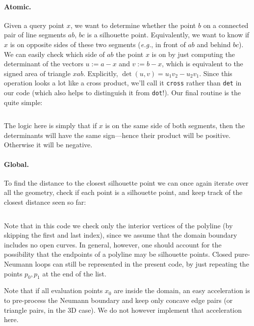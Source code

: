 \documentclass{article}
\newcommand{\code}[1]{\texttt{\small{#1}}}
\newcommand{\eg}{\emph{e.g.}} %
\renewcommand{\vec}[1]{#1}
\begin{document}
\paragraph{Atomic.} Given a query point \(\vec{x}\), we want to determine whether the point \(\vec{b}\) on a connected pair of line segments \(\vec{a}\vec{b}\), \(\vec{b}\vec{c}\) is a silhouette point.  Equivalently, we want to know if \(\vec{x}\) is on opposite sides of these two segments (\eg{}, in front of \(\vec{a}\vec{b}\) and behind \(\vec{b}\vec{c}\)).  We can easily check which side of \(\vec{a}\vec{b}\) the point \(\vec{x}\) is on by just computing the determinant of the vectors \(\vec{u} := \vec{a}-\vec{x}\) and \(\vec{v} := \vec{b}-\vec{x}\), which is equivalent to the signed area of triangle \(xab\).  Explicitly, \(\det(\vec{u},\vec{v}) = \vec{u}_1 \vec{v}_2 - \vec{u}_2 \vec{v}_1\).  Since this operation looks a lot like a cross product, we'll call it \code{cross} rather than \code{det} in our code (which also helps to distinguish it from \code{dot}!).  Our final routine is the quite simple:

\inputminted[fontsize=\small,linenos,firstline=43,lastline=46,bgcolor=bg]{cpp}{../code/WoStLaplace2D.cpp}

The logic here is simply that if \(\vec{x}\) is on the same side of both segments, then the determinants will have the same sign---hence their product will be positive.  Otherwise it will be negative.

\paragraph{Global.} To find the distance to the closest silhouette point we can once again iterate over all the geometry, check if each point is a silhouette point, and keep track of the closest distance seen so far:

\inputminted[fontsize=\small,linenos,firstline=77,lastline=88,bgcolor=bg]{cpp}{../code/WoStLaplace2D.cpp}
Note that in this code we check only the interior vertices of the polyline (by skipping the first and last index), since we assume that the domain boundary includes no open curves.  In general, however, one should account for the possibility that the endpoints of a polyline may be silhouette points.  Closed pure-Neumann loops can still be represented in the present code, by just repeating the points \(\vec{p}_0, \vec{p}_1\) at the end of the list.

Note that if all evaluation points \(x_0\) are inside the domain, an easy acceleration is to pre-process the Neumann boundary and keep only concave edge pairs (or triangle pairs, in the 3D case).  We do not however implement that acceleration here.
\end{document}
